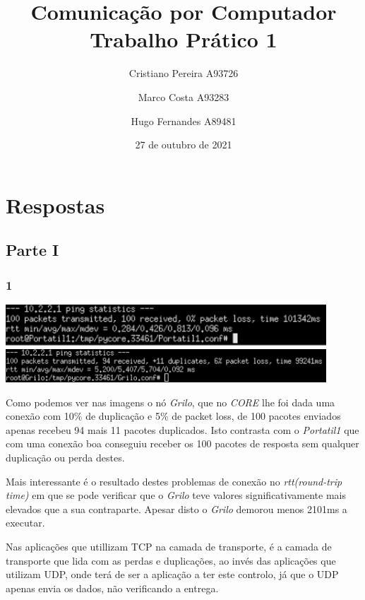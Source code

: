 \documentclass{article}
\title{
    Comunicação por Computador \\
    \large{Trabalho Prático 1}
}
\author{
    Cristiano Pereira A93726
}
\author{
    Marco Costa A93283
}
\author{
    Hugo Fernandes A89481
}
\date{27 de outubro de 2021}
\affil{
    Universidade do Minho
}
\begin{document}
        \maketitle
    \section*{Respostas}
        \subsection*{Parte I}
            \subsubsection*{1}
                {
                    \centering
                    \includegraphics[width=12cm]{images/ping-portatil.png}
                    \includegraphics[width=12cm]{images/ping-grilo.png}
                    \par
                }
                    Como podemos ver nas imagens o nó \textit{Grilo}, que no \textit{CORE} lhe foi dada
                uma conexão com 10\% de duplicação e 5\% de packet loss, de 100 pacotes enviados apenas recebeu
                94 mais 11 pacotes duplicados. Isto contrasta com o \textit{Portatil1} que com uma conexão boa conseguiu
                receber os 100 pacotes de resposta sem qualquer duplicação ou perda destes.\par

                    Mais interessante é o resultado destes problemas de conexão no \textit{rtt(round-trip time)} em que se pode verificar
                que o \textit{Grilo} teve valores significativamente mais elevados que a sua contraparte. Apesar disto o \textit{Grilo} demorou
                menos 2101ms a executar.

		Nas aplicações que utillizam TCP na camada de transporte, é a camada de transporte que lida com as perdas e duplicações, ao invés das aplicações que utilizam UDP, onde terá de ser a aplicação a ter este controlo, já que o UDP apenas envia os dados, não verificando a entrega.
\end{document}
